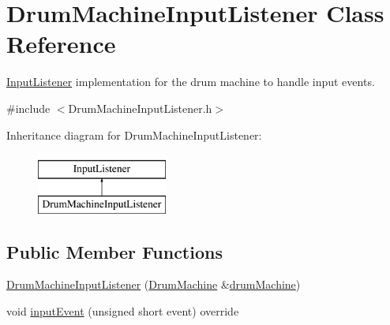 \hypertarget{class_drum_machine_input_listener}{}\section{Drum\+Machine\+Input\+Listener Class Reference}
\label{class_drum_machine_input_listener}


\hyperlink{class_input_listener}{Input\+Listener} implementation for the drum machine to handle input events.  




{\ttfamily \#include $<$Drum\+Machine\+Input\+Listener.\+h$>$}

Inheritance diagram for Drum\+Machine\+Input\+Listener\+:\begin{figure}[H]
\begin{center}
\leavevmode
\includegraphics[height=2.000000cm]{class_drum_machine_input_listener}
\end{center}
\end{figure}
\subsection*{Public Member Functions}
\begin{DoxyCompactItemize}
\item 
\hyperlink{class_drum_machine_input_listener_a7552c36ebae9e6ae49f8929ae9853354}{Drum\+Machine\+Input\+Listener} (\hyperlink{class_drum_machine}{Drum\+Machine} \&\hyperlink{class_drum_machine_input_listener_ae3f80aad0a5c4b2e4ad2712423102feb}{drum\+Machine})
\item 
void \hyperlink{class_drum_machine_input_listener_a44a620b09b35885a26befe84fa6e1ab0}{input\+Event} (unsigned short event) override
\end{DoxyCompactItemize}
